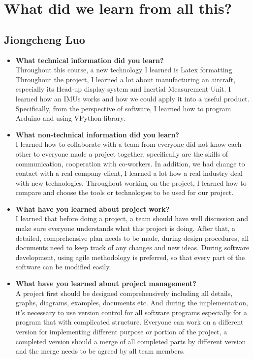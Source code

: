 \newpage
\section{What did we learn from all this?}
	\subsection{Jiongcheng Luo}
		\begin{itemize}
			\item \textbf{What technical information did you learn?}
			\\ Throughout this course, a new technology I learned is Latex formatting. Throughout the project, I learned a lot about manufacturing an aircraft, especially its Head-up display system and Inertial Measurement Unit. I learned how an IMUs works and how we could apply it into a useful product. Specifically, from the perspective of software, I learned how to program Arduino and using VPython library.\\

			\item \textbf{What non-technical information did you learn?}
			\\I learned how to collaborate with a team from everyone did not know each other to everyone made a project together, specifically are the skills of communication, cooperation with co-workers. In addition, we had change to contact with a real company client, I learned a lot how a real industry deal with new technologies.  Throughout working on the project, I learned how to compare and choose the tools or technologies to be used for our project.\\

			\item \textbf{What have you learned about project work?}
			\\I learned that before doing a project, a team should have well discussion and make sure everyone understands what this project is doing. After that, a detailed, comprehensive plan needs to be made, during design procedures, all documents need to keep track of any changes and new ideas. During software development, using agile methodology is preferred, so that every part of the software can be modified easily.\\

			\item \textbf{What have you learned about project management?}
			\\A project first should be designed comprehensively including all details, graphs, diagrams, examples, documents etc. And during the implementation, it’s necessary to use version control for all software programs especially for a program that with complicated structure. Everyone can work on a different version for implementing different purpose or portion of the project, a completed version should a merge of all completed parts by different version and the merge needs to be agreed by all team members.\\


\end{itemize}

